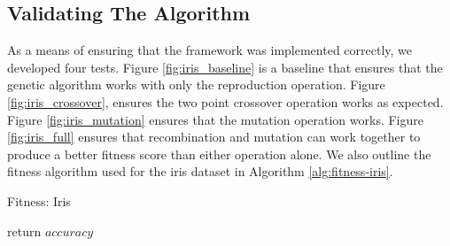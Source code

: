\documentclass[12pt, final]{dalcsthesis}
\begin{document}
\subsection{Validating The Algorithm}
As a means of ensuring that the framework was implemented correctly, we developed four tests.
Figure \ref{fig:iris_baseline} is a baseline that ensures that the genetic algorithm works with only the reproduction operation.
Figure \ref{fig:iris_crossover}, ensures the two point crossover operation works as expected.
Figure \ref{fig:iris_mutation} ensures that the mutation operation works.
Figure \ref{fig:iris_full} ensures that recombination and mutation can work together to produce a better fitness score than either operation alone.
We also outline the fitness algorithm used for the iris dataset in Algorithm \ref{alg:fitness-iris}.
\begin{algorithm}[b]
	\caption{Fitness: Iris}
	\label{alg:fitness-iris}
	\begin{algorithmic}[1]
		\EndIf
		\EndFor
		\State return $accuracy$
	\end{algorithmic}
\end{algorithm}
\end{document}
